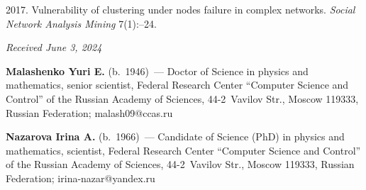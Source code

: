 \begin{multicols}{2}
{{\begin{thebibliography}{99}
 2017.
Vulnerability of clustering under nodes failure in complex networks. 
\textit{Social Network Analysis Mining} 7(1):--24.
 
\end{thebibliography}

 }
 }

\end{multicols}

\vspace*{-6pt}

\hfill{\small\textit{Received June 3, 2024}} 

\vspace*{-14pt}

\Contr

\vspace*{-3pt}

\noindent
\textbf{Malashenko Yuri E.} (b.\ 1946)~--- Doctor of Science in physics and mathematics, senior scientist, Federal Research Center 
``Computer Science and Control'' of the Russian Academy of Sciences, 44-2~Vavilov Str., Moscow 119333, Russian Federation; \mbox{malash09@ccas.ru}

\vspace*{6pt}

\noindent
\textbf{Nazarova Irina A.} (b.\ 1966)~--- Candidate of Science (PhD) in physics and mathematics, scientist, Federal Research Center 
``Computer Science and Control'' of the Russian Academy of Sciences, 44-2~Vavilov Str., Moscow 119333, Russian Federation; \mbox{irina-nazar@yandex.ru}


\label{end\stat}

\renewcommand{\bibname}{\protect\rm Литература} 